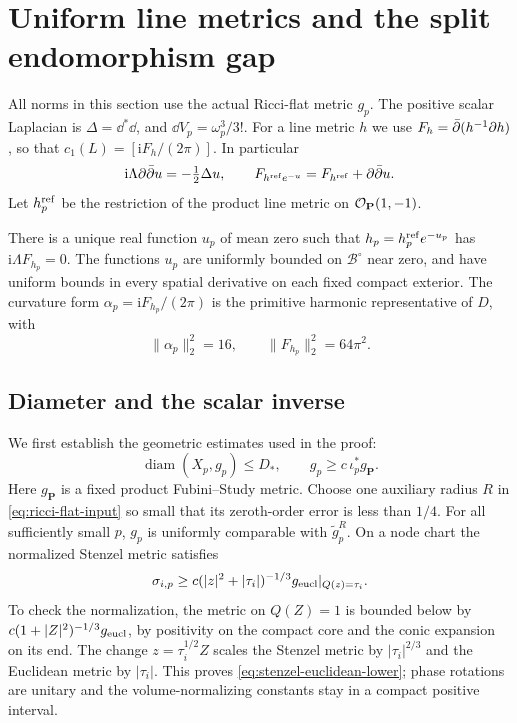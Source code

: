 \section{Uniform line metrics and the split endomorphism gap}
\label{sec:line-backgrounds}

All norms in this section use the actual Ricci-flat metric $g_p$.
The positive scalar Laplacian is $\Delta=\dd^*\dd$, and
$\dd V_p=\omega_p^3/3!$. For a line metric $h$ we use
$F_h=\bar\partial(h^{-1}\partial h)$, so that
$c_1(L)=[\mathrm iF_h/(2\pi)]$. In particular
\begin{equation}\label{eq:line-conformal}
 \mathrm i\Lambda\partial\bar\partial u=-\tfrac12\Delta u,
 \qquad F_{h^{\rm ref}e^{-u}}=F_{h^{\rm ref}}+\partial\bar\partial u.
\end{equation}
Let $h_p^{\rm ref}$ be the restriction of the product line metric
on $\mathcal O_{\mathbf P}(1,-1)$.

\begin{proposition}\label{prop:line-he}
There is a unique real function $u_p$ of mean zero such that
$h_p=h_p^{\rm ref}e^{-u_p}$ has $\mathrm i\Lambda F_{h_p}=0$.
The functions $u_p$ are uniformly bounded on $\mathcal B^\circ$
near zero, and have uniform bounds in every spatial derivative
on each fixed compact exterior. The curvature form
$\alpha_p=\mathrm iF_{h_p}/(2\pi)$ is the primitive harmonic
representative of $D$, with
\begin{equation}\label{eq:line-curvature-mass}
 \|\alpha_p\|_2^2=16,
 \qquad\|F_{h_p}\|_2^2=64\pi^2.
\end{equation}
\end{proposition}

\subsection{Diameter and the scalar inverse}

We first establish the geometric estimates used in the proof:
\begin{equation}\label{eq:diameter-ambient}
 \operatorname{diam}(X_p,g_p)\le D_*,\qquad
                  g_p\ge c\,\iota_p^*g_{\mathbf P}.
\end{equation}
Here $g_{\mathbf P}$ is a fixed product Fubini--Study metric.
Choose one auxiliary radius $R$ in
\eqref{eq:ricci-flat-input} so small that its zeroth-order
error is less than $1/4$. For all sufficiently small $p$,
$g_p$ is uniformly comparable with $\widetilde g_p^R$.
On a node chart the normalized Stenzel metric satisfies
\begin{equation}\label{eq:stenzel-euclidean-lower}
 \sigma_{i,p}\ge c(|z|^2+|\tau_i|)^{-1/3}
                              g_{\rm eucl}|_{Q(z)=\tau_i}.
\end{equation}
To check the normalization, the metric on $Q(Z)=1$ is bounded
below by $c(1+|Z|^2)^{-1/3}g_{\rm eucl}$, by positivity on
the compact core and the conic expansion on its end.
The change $z=\tau_i^{1/2}Z$ scales the Stenzel metric by
$|\tau_i|^{2/3}$ and the Euclidean metric by $|\tau_i|$.
This proves \eqref{eq:stenzel-euclidean-lower}; phase rotations
are unitary and the volume-normalizing constants stay in a
compact positive interval.

